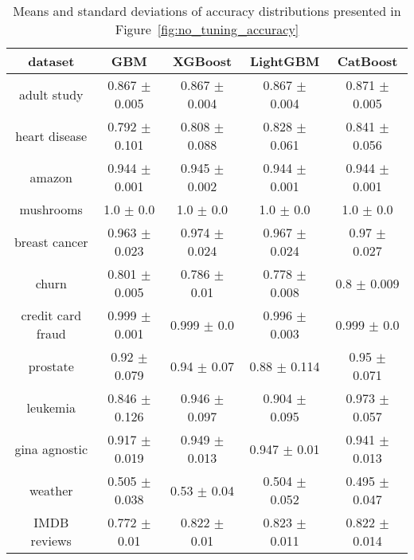 \documentclass[magisterska, english]{pwr_wmat_praca_dyplomowa}
\theoremstyle{plain}
\numberwithin{theorem}{chapter}
\theoremstyle{definition}
\numberwithin{theorem}{chapter}
\begin{document}
\begin{table}[h!]
\centering
\begin{tabular}{|c|c|c|c|c|}
\hline
\textbf{dataset}  & \textbf{GBM}  & \textbf{XGBoost}  & \textbf{LightGBM}  & \textbf{CatBoost} \\ \hline
adult study & \cellcolor{red}0.867 $\pm$ 0.005 & 0.867 $\pm$ 0.004 & 0.867 $\pm$ 0.004 & \cellcolor{green}0.871 $\pm$ 0.005\\ \hline
heart disease &\cellcolor{red} 0.792 $\pm$ 0.101 & 0.808 $\pm$ 0.088 & 0.828 $\pm$ 0.061 & \cellcolor{green}0.841 $\pm$ 0.056\\ \hline
amazon & \cellcolor{red}0.944 $\pm$ 0.001 & \cellcolor{green}0.945 $\pm$ 0.002 & \cellcolor{red}0.944 $\pm$ 0.001 & \cellcolor{red}0.944 $\pm$ 0.001\\ \hline
mushrooms & 1.0 $\pm$ 0.0 & 1.0 $\pm$ 0.0 & 1.0 $\pm$ 0.0 & 1.0 $\pm$ 0.0\\ \hline
breast cancer & \cellcolor{red}0.963 $\pm$ 0.023 & \cellcolor{green}0.974 $\pm$ 0.024 & 0.967 $\pm$ 0.024 & 0.97 $\pm$ 0.027\\ \hline
churn & \cellcolor{green}0.801 $\pm$ 0.005 & 0.786 $\pm$ 0.01 & \cellcolor{red}0.778 $\pm$ 0.008 & 0.8 $\pm$ 0.009\\ \hline
credit card fraud & 0.999 $\pm$ 0.001 & \cellcolor{green}0.999 $\pm$ 0.0 & \cellcolor{red}0.996 $\pm$ 0.003 & \cellcolor{green}0.999 $\pm$ 0.0\\ \hline
prostate & 0.92 $\pm$ 0.079 & 0.94 $\pm$ 0.07 & \cellcolor{red}0.88 $\pm$ 0.114 & \cellcolor{green}0.95 $\pm$ 0.071\\ \hline
leukemia & \cellcolor{red}0.846 $\pm$ 0.126 & 0.946 $\pm$ 0.097 & 0.904 $\pm$ 0.095 & \cellcolor{green}0.973 $\pm$ 0.057\\ \hline
gina agnostic & \cellcolor{red}0.917 $\pm$ 0.019 & \cellcolor{green}0.949 $\pm$ 0.013 & 0.947 $\pm$ 0.01 & 0.941 $\pm$ 0.013\\ \hline
weather & 0.505 $\pm$ 0.038 & \cellcolor{green}0.53 $\pm$ 0.04 & 0.504 $\pm$ 0.052 & \cellcolor{red}0.495 $\pm$ 0.047\\ \hline
IMDB reviews & \cellcolor{red}0.772 $\pm$ 0.01 & 0.822 $\pm$ 0.01 & \cellcolor{green}0.823 $\pm$ 0.011 & 0.822 $\pm$ 0.014\\ \hline
\end{tabular}
\caption{Means and standard deviations of accuracy distributions presented in Figure~\ref{fig:no_tuning_accuracy}}
\label{tab:no_tuning_accuracy}
\end{table}
\end{document}
